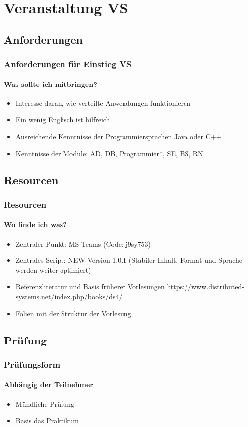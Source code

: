 \section{Veranstaltung VS}
\subsection{Anforderungen}
\begin{frame}
  \frametitle{Anforderungen für Einstieg VS}
  \framesubtitle{Was sollte ich mitbringen? }
  \begin{itemize}
    \item Interesse daran, wie verteilte Anwendungen funktionieren
    \item Ein wenig Englisch ist hilfreich
    \item Ausreichende Kenntnisse der Programmiersprachen Java oder C++
    \item Kenntnisse der Module: AD, DB, Programmier*, SE, BS, RN 
  \end{itemize}
\end{frame}
\subsection{Resourcen}
\begin{frame}
  \frametitle{Resourcen}
  \framesubtitle{Wo finde ich was?}
  \begin{itemize}
    \item Zentraler Punkt: MS Teams (Code: j9sy753)
    \item Zentrales Script: NEW Version 1.0.1 (Stabiler Inhalt, Format und Sprache werden weiter optimiert)
    \item Referenzliteratur und Basis früherer Vorlesungen \url{https://www.distributed-systems.net/index.php/books/ds4/}
    \item Folien mit der Struktur der Vorlesung 
  \end{itemize}
\end{frame}

\subsection{Prüfung}
\begin{frame}
  \frametitle{Prüfungsform}
  \framesubtitle{Abhängig der Teilnehmer}
  \begin{itemize}
    \item Mündliche Prüfung
    \item Basis das Praktikum
  \end{itemize}
\end{frame}

